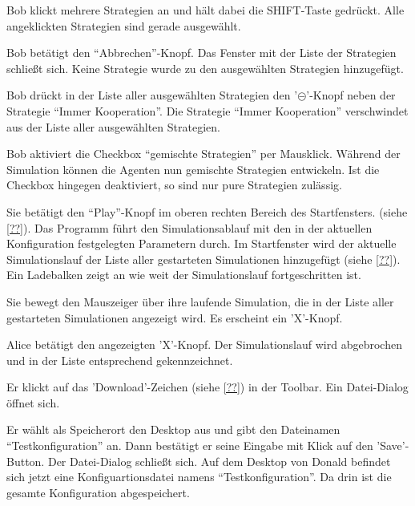 \documentclass[parskip=full,11pt]{scrartcl}
\begin{document}
\teststep{}
{Bob klickt mehrere Strategien an und hält dabei die SHIFT-Taste gedrückt.}
{Alle angeklickten Strategien sind gerade ausgewählt.}

\teststep{}
{Bob betätigt den \enquote{Abbrechen}-Knopf.}
{Das Fenster mit der Liste der Strategien schließt sich. Keine Strategie wurde zu den ausgewählten Strategien hinzugefügt.}

{Bob drückt in der Liste aller ausgewählten Strategien den '\(\circleddash\)'-Knopf neben der Strategie \enquote{Immer Kooperation}.}
{Die Strategie \enquote{Immer Kooperation} verschwindet aus der Liste aller ausgewählten Strategien.}

{Bob aktiviert die Checkbox \enquote{gemischte Strategien} per Mausklick.}
{Während der Simulation können die Agenten nun gemischte Strategien entwickeln. Ist die Checkbox hingegen deaktiviert, so sind nur pure Strategien zulässig.}


{Sie betätigt den \enquote{Play}-Knopf im oberen rechten Bereich des Startfensters. (siehe \cref{??}).}
{Das Programm führt den Simulationsablauf mit den in der aktuellen Konfiguration festgelegten Parametern durch. Im Startfenster wird der aktuelle Simulationslauf der Liste aller gestarteten Simulationen hinzugefügt (siehe \cref{??}). Ein Ladebalken zeigt an wie weit der Simulationslauf fortgeschritten ist.}

{Sie bewegt den Mauszeiger über ihre laufende Simulation, die in der Liste aller gestarteten Simulationen angezeigt wird.}
{Es erscheint ein 'X'-Knopf.}

\teststep{}
{Alice betätigt den angezeigten 'X'-Knopf.}
{Der Simulationslauf wird abgebrochen und in der Liste entsprechend gekennzeichnet.}


{Er klickt auf das 'Download'-Zeichen (siehe \cref{??}) in der Toolbar.}
{Ein Datei-Dialog öffnet sich.}

{Er wählt als Speicherort den Desktop aus und gibt den Dateinamen \enquote{Testkonfiguration} an. Dann bestätigt er seine Eingabe mit Klick auf den 'Save'-Button.}
{Der Datei-Dialog schließt sich. Auf dem Desktop von Donald befindet sich jetzt eine Konfiguartionsdatei namens \enquote{Testkonfiguration}. Da drin ist die gesamte Konfiguration abgespeichert.}
\end{document}
